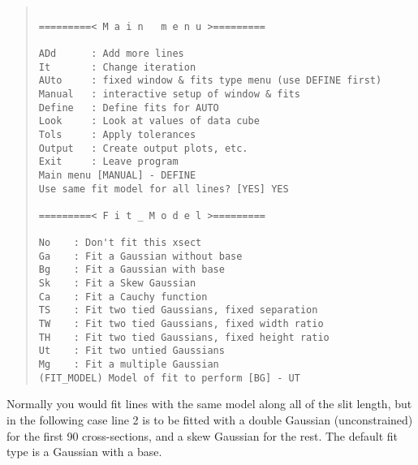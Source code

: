\begin{quote}\begin{verbatim}
 
=========< M a i n   m e n u >=========
 
ADd      : Add more lines
It       : Change iteration
AUto     : fixed window & fits type menu (use DEFINE first)
Manual   : interactive setup of window & fits
Define   : Define fits for AUTO
Look     : Look at values of data cube
Tols     : Apply tolerances
Output   : Create output plots, etc.
Exit     : Leave program
Main menu [MANUAL] - DEFINE
Use same fit model for all lines? [YES] YES
 
=========< F i t _ M o d e l >=========
 
No    : Don't fit this xsect
Ga    : Fit a Gaussian without base
Bg    : Fit a Gaussian with base
Sk    : Fit a Skew Gaussian
Ca    : Fit a Cauchy function
TS    : Fit two tied Gaussians, fixed separation
TW    : Fit two tied Gaussians, fixed width ratio
TH    : Fit two tied Gaussians, fixed height ratio
Ut    : Fit two untied Gaussians
Mg    : Fit a multiple Gaussian
(FIT_MODEL) Model of fit to perform [BG] - UT
\end{verbatim}\end{quote}
Normally you would fit lines with the same model along all of
the slit length, but in the following case line 2 is to be fitted with a
double Gaussian (unconstrained) for the first 90 cross-sections, and a
skew Gaussian for the rest.
The default fit type is a Gaussian with a base.

